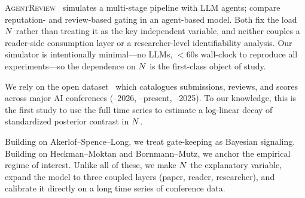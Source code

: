  \textsc{AgentReview}~\citep{jin2024agentreview} simulates a multi-stage \openreview pipeline with LLM agents; \citet{grimaldo2018reputation} compare reputation- and review-based gating in an agent-based model. Both fix the load $N$ rather than treating it as the key independent variable, and neither couples a reader-side consumption layer or a researcher-level identifiability analysis. Our simulator is intentionally minimal---no LLMs, $<60$s wall-clock to reproduce all experiments---so the dependence on $N$ is the first-class object of study.

 We rely on the open \papercopilot dataset~\citep{yang2025papercopilot} which catalogues submissions, reviews, and scores across major AI conferences (--2026, --present, --2025). To our knowledge, this is the first study to use the full \iclr time series to estimate a log-linear decay of standardized posterior contrast in $N$.

 Building on Akerlof--Spence--Long, we treat gate-keeping as Bayesian signaling. Building on Heckman--Moktan and Bornmann--Mutz, we anchor the empirical regime of interest. Unlike all of these, we make $N$ the explanatory variable, expand the model to three coupled layers (paper, reader, researcher), and calibrate it directly on a long time series of conference data.
